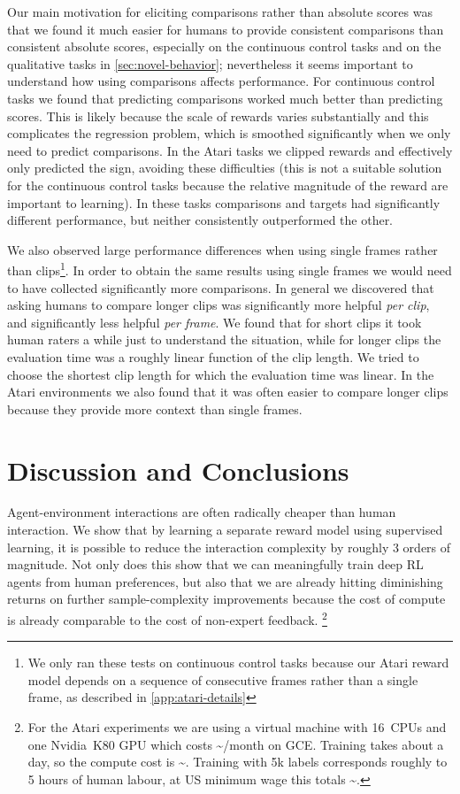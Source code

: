 Our main motivation for eliciting comparisons rather than absolute scores was that we found it much easier for humans to provide consistent comparisons than consistent absolute scores, especially on the continuous control tasks and on the qualitative tasks in \autoref{sec:novel-behavior}; nevertheless it seems important to understand how using comparisons affects performance. For continuous control tasks we found that predicting comparisons worked much better than predicting scores. This is likely because the scale of rewards varies substantially and this complicates the regression problem, which is smoothed significantly when we only need to predict comparisons. In the Atari tasks we clipped rewards and effectively only predicted the sign, avoiding these difficulties (this is not a suitable solution for the continuous control tasks because the relative magnitude of the reward are important to learning). In these tasks comparisons and targets had significantly different performance, but neither consistently outperformed the other.

We also observed large performance differences when using single frames rather than clips\footnote{We only ran these tests on continuous control tasks because our Atari reward model depends on a sequence of consecutive frames rather than a single frame, as described in \autoref{app:atari-details}}.
In order to obtain the same results using single frames we would need to have collected significantly more comparisons. In general we discovered that asking humans to compare longer clips was significantly more helpful \emph{per clip}, and significantly less helpful \emph{per frame}. We found that for short clips it took human raters a while just to understand the situation, while for longer clips the evaluation time was a roughly linear function of the clip length. We tried to choose the shortest clip length for which the evaluation time was linear. In the Atari environments we also found that it was often easier to compare longer clips because they provide more context than single frames.

\section{Discussion and Conclusions}

Agent-environment interactions are often radically cheaper than human interaction. We show that by learning a separate reward model using supervised learning, it is possible to reduce the interaction complexity by roughly 3 orders of magnitude. Not only does this show that we can meaningfully train deep RL agents from human preferences, but also that we are already hitting diminishing returns on further sample-complexity improvements because the cost of compute is already comparable to the cost of non-expert feedback.
\footnote{For the Atari experiments we are using a virtual machine with 16~CPUs and one Nvidia~K80 GPU which costs \textasciitilde{}/month on GCE. Training takes about a day, so the compute cost is \textasciitilde{}.
Training with 5k labels corresponds roughly to 5 hours of human labour, at US minimum wage this totals \textasciitilde{}.}

